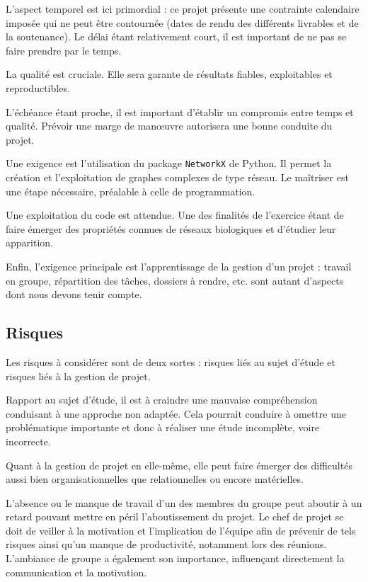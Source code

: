 L'aspect temporel est ici primordial : ce projet présente une contrainte calendaire imposée qui ne peut être contournée (dates de rendu des différents livrables et de la soutenance). Le délai étant relativement court, il est important de ne pas se faire prendre par le temps.

La qualité est cruciale. Elle sera garante de résultats fiables, exploitables et reproductibles. 

L'échéance étant proche, il est important d'établir un compromis entre temps et qualité. Prévoir une marge de manœuvre autorisera une bonne conduite du projet.

\medskip
Une exigence est l'utilisation du package \verb?NetworkX? de Python. Il permet la création et l'exploitation de graphes complexes de type réseau. Le maîtriser est une étape nécessaire, préalable à celle de programmation.

Une exploitation du code est attendue. Une des finalités de l'exercice étant de faire émerger des propriétés connues de réseaux biologiques et d'étudier leur apparition.

\medskip
Enfin, l'exigence principale est l'apprentissage de la gestion d'un projet : travail en groupe, répartition des tâches, dossiers à rendre, etc. sont autant d'aspects dont nous devons tenir compte.

\subsection{Risques}
Les risques à considérer sont de deux sortes : risques liés au sujet d'étude et risques liés à la gestion de projet.

\medskip
Rapport au sujet d'étude, il est à craindre une mauvaise compréhension conduisant à une approche non adaptée. Cela pourrait conduire à omettre une problématique importante et donc à réaliser une étude incomplète, voire incorrecte.

\medskip
Quant à la gestion de projet en elle-même, elle peut faire émerger des difficultés aussi bien organisationnelles que relationnelles ou encore matérielles.

L'absence ou le manque de travail d'un des membres du groupe peut aboutir à un retard pouvant mettre en péril l'aboutissement du projet. Le chef de projet se doit de veiller à la motivation et l'implication de l'équipe afin de prévenir de tels risques ainsi qu'un manque de productivité, notamment lors des réunions. L'ambiance de groupe a également son importance, influençant directement la communication et la motivation.

